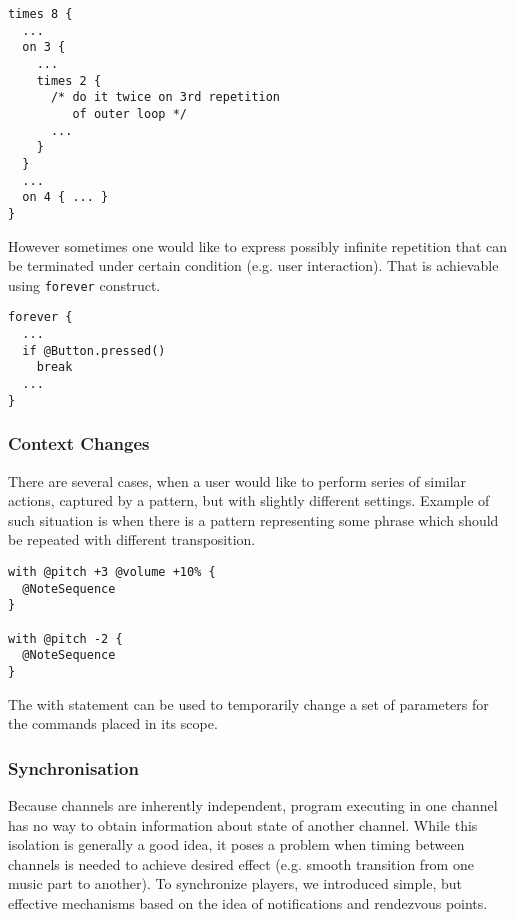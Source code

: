 \documentclass{article}
\begin{document}
\begin{lstlisting}[caption=Nested loops and alternatives]
times 8 {
  ...
  on 3 {
    ...
    times 2 {
      /* do it twice on 3rd repetition
         of outer loop */
      ...
    }
  }
  ... 
  on 4 { ... }
}
\end{lstlisting}

However sometimes one would like to express possibly infinite repetition that
can be terminated under certain condition (e.g. user interaction). That is
achievable using {\tt forever} construct.

\begin{lstlisting}[caption=Infinite loop with break on user action]
forever {
  ...
  if @Button.pressed()
    break
  ...
}
\end{lstlisting}

\subsubsection{Context Changes}

There are several cases, when a user would like to perform series of similar
actions, captured by a pattern, but with slightly different settings. Example
of such situation is when there is a pattern representing some phrase which
should be repeated with different transposition.

\begin{lstlisting}[caption=Temporary parameters modification]
with @pitch +3 @volume +10% {
  @NoteSequence
}

with @pitch -2 {
  @NoteSequence
}
\end{lstlisting}

The with statement can be used to temporarily change a set of parameters for
the commands placed in its scope.

\subsubsection{Synchronisation}

Because channels are inherently independent, program executing in one channel
has no way to obtain information about state of another channel. While this
isolation is generally a good idea, it poses a problem when timing between
channels is needed to achieve desired effect (e.g. smooth transition from one
music part to another). To synchronize players, we introduced simple, but
effective mechanisms based on the idea of notifications and rendezvous points.
\end{document}
